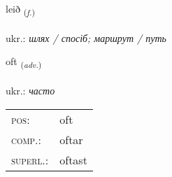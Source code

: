 \documentclass[frontgrid, backgrid]{flacards}\usepackage[]{graphicx}\usepackage[]{xcolor}
\begin{document}
\renewcommand{\flhead}{\vskip5pt \fboxsep=0pt {\small\bfseries\footnotesize Nafnorð | іменник}}
\renewcommand{\fcfoot}{\vskip5pt \fboxsep=0pt \hspace{2pt}{\small\bfseries\footnotesize 1K}}

\renewcommand{\blhead}{\vskip5pt {\small\bfseries\footnotesize Nafnorð | іменник }}
\renewcommand{\bcfoot}{\vskip5pt \hspace{2pt}{\small\bfseries\footnotesize 1K}}


{leið \small{\textsubscript{(\textit{f.})}} \\[1ex] %
\textphonetic{[leiːð]} \\
ukr.: \emph{шлях / спосіб; маршрут / путь} \\  [2ex]
\renewcommand*{\arraystretch}{0.8}
}

\renewcommand{\flhead}{\vskip5pt \fboxsep=0pt {\small\bfseries\footnotesize Atviksorð | прислівник}}
\renewcommand{\fcfoot}{\vskip5pt \fboxsep=0pt \hspace{2pt}{\small\bfseries\footnotesize 1K}}

\renewcommand{\blhead}{\vskip5pt {\small\bfseries\footnotesize Atviksorð | прислівник }}
\renewcommand{\bcfoot}{\vskip5pt \hspace{2pt}{\small\bfseries\footnotesize 1K}}


{oft \small{\textsubscript{(\textit{adv.})}} \\[1ex] %
\textphonetic{[ɔft]} \\
ukr.: \emph{часто} \\  [2ex]
\renewcommand*{\arraystretch}{0.8}
\begin{tabular}{ll}
\textsc{pos}: & oft \\ 
\textsc{comp.}: & oftar \\ 
\textsc{superl.}: & oftast \\
\end{tabular}
}
\end{document}
